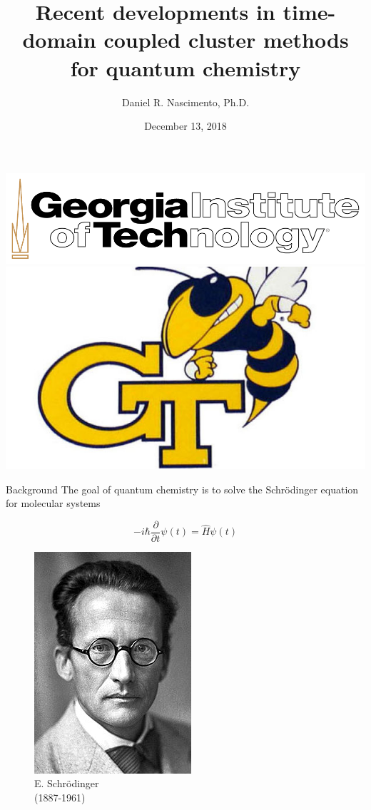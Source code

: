 \documentclass{beamer}
\title[Time-domain coupled cluster methods]{Recent developments in time-domain coupled cluster methods for quantum chemistry}
\author{Daniel R. Nascimento, Ph.D.}
\institute{Georgia Institute of Technology}
\date{December 13, 2018}
\begin{document}
\begin{frame}
 \includegraphics[scale=0.1]{figures/Gatech2.png}
 \hspace{155pt}
 \includegraphics[scale=0.1]{figures/Gatech1.jpg}
 \titlepage
\end{frame}


\begin{frame}{Background}
The goal of quantum chemistry is to solve the Schr{\"o}dinger equation for molecular systems
\begin{multicols}{2}
\begin{equation}
 -i \hbar \frac{\partial}{\partial t} \psi (t) = \hat{H} \psi (t) \nonumber
\end{equation}
\begin{figure}
 \includegraphics[scale=0.3]{figures/Schrodinger.jpg}\\
 E. Schr{\"o}dinger \\ (1887-1961)
\end{figure}
\end{multicols}
\end{frame}
\end{document}
